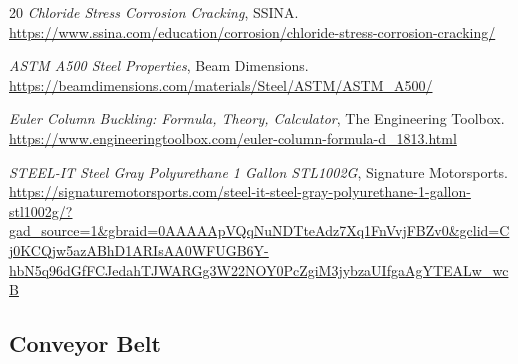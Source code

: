 \documentclass[10pt]{project}
\begin{document}
\begin{thebibliography}{20}
\textit{Chloride Stress Corrosion Cracking}, SSINA.
\url{https://www.ssina.com/education/corrosion/chloride-stress-corrosion-cracking/}

\textit{ASTM A500 Steel Properties}, Beam Dimensions.
\url{https://beamdimensions.com/materials/Steel/ASTM/ASTM_A500/}

\textit{Euler Column Buckling: Formula, Theory, Calculator}, The Engineering Toolbox.
\url{https://www.engineeringtoolbox.com/euler-column-formula-d_1813.html}

\textit{STEEL-IT Steel Gray Polyurethane 1 Gallon STL1002G}, Signature Motorsports.
\url{https://signaturemotorsports.com/steel-it-steel-gray-polyurethane-1-gallon-stl1002g/?gad_source=1&gbraid=0AAAAApVQqNuNDTteAdz7Xq1FnVvjFBZv0&gclid=Cj0KCQjw5azABhD1ARIsAA0WFUGB6Y-hbN5q96dGfFCJedahTJWARGg3W22NOY0PcZgiM3jybzaUIfgaAgYTEALw_wcB}

\end{thebibliography}

%

\let\section=\seccs

\section{Appendix}\label{Appendix}





\subsection{Conveyor Belt}\label{pdf:belt}
\end{document}
